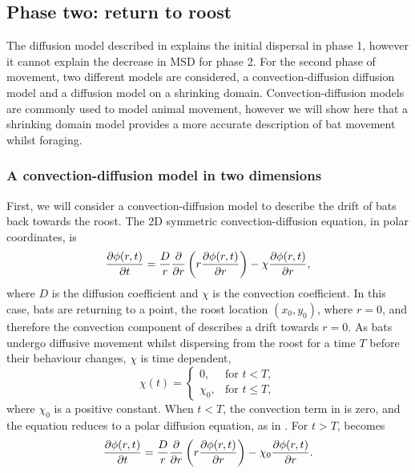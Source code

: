 
\subsection{Phase two: return to roost}

The diffusion model described in  explains the initial dispersal in phase 1, however it cannot explain the decrease in MSD for phase 2. For the second phase of movement, two different models are considered, a convection-diffusion diffusion model and a diffusion model on a shrinking domain. Convection-diffusion models are commonly used to model animal movement, however we will show here that a shrinking domain model provides a more accurate description of bat movement whilst foraging.

\subsubsection{A convection-diffusion model in two dimensions}

 First, we will consider a convection-diffusion model to describe the drift of bats back towards the roost. The 2D symmetric convection-diffusion equation, in polar coordinates, is
%
\begin{equation}
  \frac{\partial \phi(r,t)}{\partial t} = \frac{D}{r} \frac{\partial }{\partial r}\left(r \frac{\partial \phi(r,t)}{\partial r} \right) - \chi \frac{\partial \phi(r,t)}{\partial r},
  \label{eqn:convection}
\end{equation}
%
where $D$ is the diffusion coefficient and $\chi$ is the convection coefficient. In this case, bats are returning to a point, the roost location $(x_0,y_0)$, where $r=0$, and therefore the convection component of  describes a drift towards $r=0$. As bats undergo diffusive movement whilst dispersing from the roost for a time $T$ before their behaviour changes, $\chi$ is time dependent,
%
\begin{equation}
\chi (t) =  \begin{cases}
    0, & \text{for } t < T, \\
    \chi_0, & \text{for } t \leq T,
  \end{cases}
  \label{eqn:time_dependentchi}
\end{equation}
%
where $\chi_0$ is a positive constant. When $t < T$, the convection term in  is zero, and the equation reduces to a polar diffusion equation, as in . For $t > T$,  becomes
%
\begin{equation}
  \frac{\partial \phi(r,t)}{\partial t} = \frac{D}{r} \frac{\partial }{\partial r}\left(r \frac{\partial \phi(r,t)}{\partial r} \right) - \chi_0 \frac{\partial \phi(r,t)}{\partial r}.
\end{equation}

